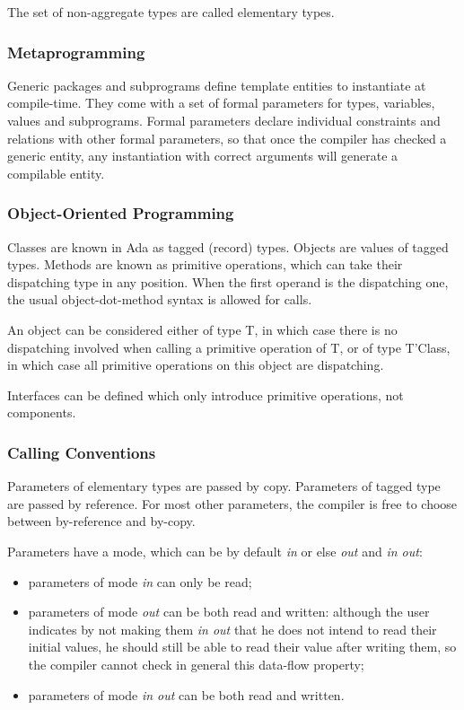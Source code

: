 \documentclass[fullpage]{article}
\begin{document}
The set of non-aggregate types are called elementary types.

\subsubsection{Metaprogramming}

Generic packages and subprograms define template entities to instantiate at
compile-time. They come with a set of formal parameters for types, variables,
values and subprograms. Formal parameters declare individual constraints and
relations with other formal parameters, so that once the compiler has checked a
generic entity, any instantiation with correct arguments will generate a
compilable entity.

\subsubsection{Object-Oriented Programming}

Classes are known in Ada as tagged (record) types. Objects are values of tagged
types. Methods are known as primitive operations, which can take their
dispatching type in any position. When the first operand is the dispatching
one, the usual object-dot-method syntax is allowed for calls.

An object can be considered either of type T, in which case there is no
dispatching involved when calling a primitive operation of T, or of type
T'Class, in which case all primitive operations on this object are dispatching.

Interfaces can be defined which only introduce primitive operations, not
components.

\subsubsection{Calling Conventions}

Parameters of elementary types are passed by copy.  Parameters of tagged type
are passed by reference. For most other parameters, the compiler is free to
choose between by-reference and by-copy.

Parameters have a mode, which can be by default \emph{in} or else \emph{out}
and \emph{in out}:
\begin{itemize}
\item parameters of mode \emph{in} can only be read;
\item parameters of mode \emph{out} can be both read and written: although the
  user indicates by not making them \emph{in out} that he does not intend to
  read their initial values, he should still be able to read their value after
  writing them, so the compiler cannot check in general this data-flow
  property;
\item parameters of mode \emph{in out} can be both read and written.
\end{itemize}
\end{document}
